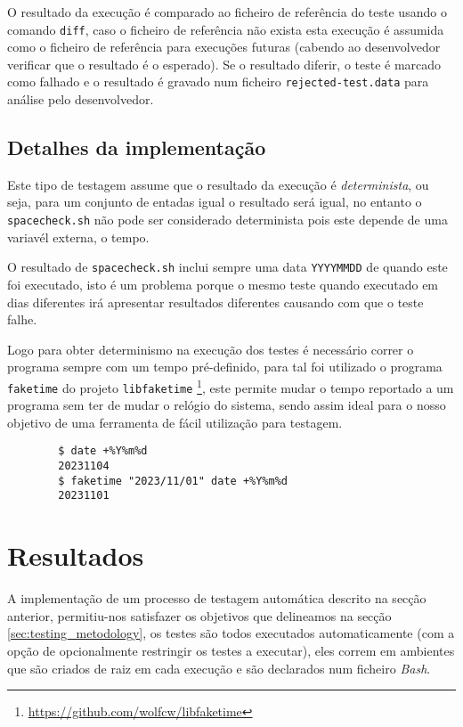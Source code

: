 O resultado da execução é comparado ao ficheiro de referência do teste usando o
comando \Verb|diff|, caso o ficheiro de referência não exista esta execução é
assumida como o ficheiro de referência para execuções futuras (cabendo ao
desenvolvedor verificar que o resultado é o esperado). Se o resultado diferir,
o teste é marcado como falhado e o resultado é gravado num ficheiro
\Verb|rejected-test.data| para análise pelo desenvolvedor.

\subsection{Detalhes da implementação}

Este tipo de testagem assume que o resultado da execução é \emph{determinista},
ou seja, para um conjunto de entadas igual o resultado será igual, no entanto
o \Verb|spacecheck.sh| não pode ser considerado determinista pois este depende
de uma variavél externa, o tempo.

O resultado de \Verb|spacecheck.sh| inclui sempre uma data \Verb|YYYYMMDD| de
quando este foi executado, isto é um problema porque o mesmo teste quando
executado em dias diferentes irá apresentar resultados diferentes causando com
que o teste falhe.

Logo para obter determinismo na execução dos testes é necessário correr o
programa sempre com um tempo pré-definido, para tal foi utilizado o programa
\Verb|faketime| do projeto \Verb|libfaketime|
\footnote{\url{https://github.com/wolfcw/libfaketime}},
este permite mudar o tempo reportado a um programa sem ter de mudar o relógio
do sistema, sendo assim ideal para o nosso objetivo de uma ferramenta de fácil
utilização para testagem.

\begin{listing}[H]
	\begin{verbatim}
		$ date +%Y%m%d
		20231104
		$ faketime "2023/11/01" date +%Y%m%d
		20231101
	\end{verbatim}
	\cprotect\caption{Exemplo do funcionamento de \Verb|faketime|.}
\end{listing}

\section{Resultados}

A implementação de um processo de testagem automática descrito na secção
anterior, permitiu-nos satisfazer os objetivos que delineamos na secção
\ref{sec:testing_metodology}, os testes são todos executados automaticamente (com a
opção de opcionalmente restringir os testes a executar), eles correm em
ambientes que são criados de raiz em cada execução e são declarados num ficheiro
\emph{Bash}.

